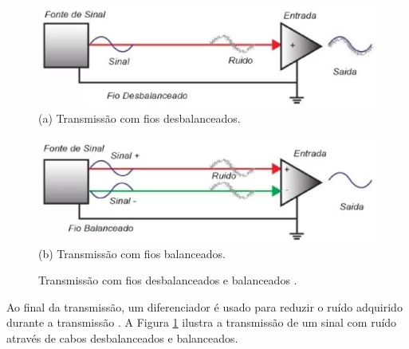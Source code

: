 \begin{figure}[htpb]
    \centering
    \begin{minipage}[t]{0.4\textwidth}
        \centering
        \includegraphics[width=\textwidth]{figuras/fig11.eps}
        \vspace{0.3cm} %
        (a) Transmissão com fios desbalanceados.
    \end{minipage}
    \hspace{0.1cm} %
    \begin{minipage}[t]{0.4\textwidth}
        \centering
        \includegraphics[width=\textwidth]{figuras/fig12.eps}
        \vspace{0.3cm} %
        (b) Transmissão com fios balanceados.
    \end{minipage}

    \caption{Transmissão com fios desbalanceados e balanceados \cite{proaudiospQualDiferena}.}
    \label{fig12}
\end{figure}



Ao final da transmissão, um diferenciador é usado para reduzir o ruído adquirido durante a transmissão \cite{bartlett}.
A Figura \ref{fig12} ilustra a transmissão de um sinal com ruído através de cabos desbalanceados e balanceados.




